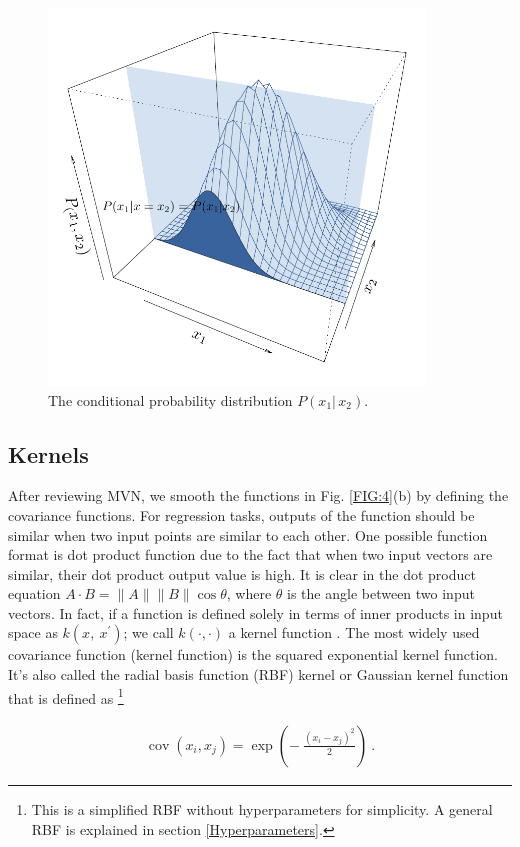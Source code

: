 \documentclass[12pt,letterpaper,fleqn,oneside,titlepage]{offroad-report}
\begin{document}
\begin{figure}[h!]
	\centering
		\includegraphics[trim=0.4cm 0.4cm 0.6cm 0.8cm, width=10.0cm]{figs/2d_gaussian_conditional.pdf}
	\caption{The conditional probability distribution $P(x_1 \vert \, x_2)$.}
	\label{FIG:6}
\end{figure}

\subsection{Kernels}

After reviewing MVN, we smooth the functions in Fig. \ref{FIG:4}(b) by defining the covariance functions. For regression tasks, outputs of the function should be similar when two input points are similar to each other. One possible function format is dot product function due to the fact that when two input vectors are similar, their dot product output value is high. It is clear in the dot product equation $A \cdot B = \lVert A \rVert \lVert B \rVert \operatorname{cos}\theta$, where $\theta$ is the angle between two input vectors. In fact, if a function is defined solely in terms of inner products in input space as $k(x,\ x^\prime)$; we call $k(\cdot, \cdot)$ a kernel function \cite{Rasmussen2006}. The most widely used covariance function (kernel function) is the squared exponential kernel function. It's also called the radial basis function (RBF) kernel or Gaussian kernel function that is defined as \footnote{This is a simplified RBF without hyperparameters for simplicity. A general RBF is explained in section \ref{Hyperparameters}.} 
\begin{ceqn}
    \begin{align}
       \operatorname{cov}(x_i, x_j)=\exp\left(-~\frac{(x_i-x_j)^2}{2}\right) \ . \nonumber
    \end{align}
\end{ceqn}
\end{document}
